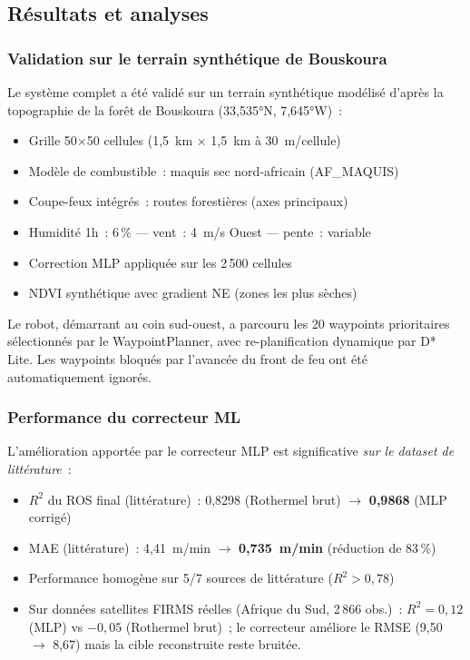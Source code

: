 \subsection{Résultats et analyses}

\subsubsection{Validation sur le terrain synthétique de Bouskoura}

Le système complet a été validé sur un terrain synthétique modélisé d'après la topographie de la forêt de Bouskoura (33,535°N, 7,645°W)~:

\begin{itemize}[nosep]
    \item Grille 50$\times$50 cellules (1,5~km $\times$ 1,5~km à 30~m/cellule)
    \item Modèle de combustible~: maquis sec nord-africain (AF\_MAQUIS)
    \item Coupe-feux intégrés~: routes forestières (axes principaux)
    \item Humidité 1h~: 6\,\% --- vent~: 4~m/s Ouest --- pente~: variable
    \item Correction MLP appliquée sur les 2\,500 cellules
    \item NDVI synthétique avec gradient NE (zones les plus sèches)
\end{itemize}

Le robot, démarrant au coin sud-ouest, a parcouru les 20 waypoints prioritaires sélectionnés par le WaypointPlanner, avec re-planification dynamique par D* Lite. Les waypoints bloqués par l'avancée du front de feu ont été automatiquement ignorés.

\subsubsection{Performance du correcteur ML}

L'amélioration apportée par le correcteur MLP est significative \textit{sur le dataset de littérature}~:

\begin{itemize}[nosep]
    \item $R^2$ du ROS final (littérature)~: 0,8298 (Rothermel brut) $\rightarrow$ \textbf{0,9868} (MLP corrigé)
    \item MAE (littérature)~: 4,41~m/min $\rightarrow$ \textbf{0,735~m/min} (réduction de 83\,\%)
    \item Performance homogène sur 5/7 sources de littérature ($R^2 > 0{,}78$)
    \item Sur données satellites FIRMS réelles (Afrique du Sud, 2\,866 obs.)~: $R^2 = 0{,}12$ (MLP) vs $-0{,}05$ (Rothermel brut)~; le correcteur améliore le RMSE (9{,}50 $\rightarrow$ 8{,}67) mais la cible reconstruite reste bruitée.
\end{itemize}

